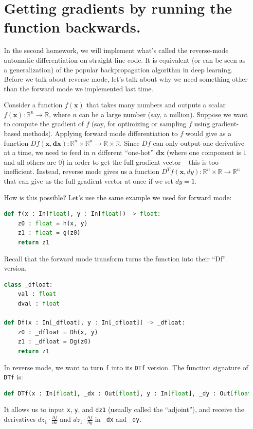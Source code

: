 




\section{Getting gradients by running the function backwards.}

In the second homework, we will implement what's called the reverse-mode automatic differentiation on straight-line code. It is equivalent (or can be seen as a generalization) of the popular backpropagation algorithm in deep learning. Before we talk about reverse mode, let's talk about why we need something other than the forward mode we implemented last time.

Consider a function $f(\mathbf{x})$ that takes many numbers and outputs a scalar $f(\mathbf{x}): \mathbb{R}^n \rightarrow \mathbb{R}$, where $n$ can be a large number (say, a million). Suppose we want to compute the gradient of $f$ (say, for optimizing or sampling $f$ using gradient-based methods). Applying forward mode differentiation to $f$ would give as a function $Df(\mathbf{x}, \mathbf{dx}) : \mathbb{R}^n \times \mathbb{R}^n \rightarrow \mathbb{R} \times \mathbb{R}$. Since $Df$ can only output one derivative at a time, we need to feed in $n$ different ``one-hot'' $\mathbf{dx}$ (where one component is $1$ and all others are $0$) in order to get the full gradient vector -- this is too inefficient. Instead, reverse mode gives us a function $D^{T}f(\mathbf{x}, dy) : \mathbb{R}^n \times \mathbb{R} \rightarrow \mathbb{R}^n$ that can give us the full gradient vector at once if we set $dy=1$.

How is this possible? Let's use the same example we used for forward mode:
\begin{lstlisting}[language=Python]
def f(x : In[float], y : In[float]) -> float:
	z0 : float = h(x, y)
	z1 : float = g(z0)
	return z1
\end{lstlisting}
Recall that the forward mode transform turns the function into their ``Df'' version.
\begin{lstlisting}[language=Python]
class _dfloat:
	val : float
	dval : float

def Df(x : In[_dfloat], y : In[_dfloat]) -> _dfloat:
	z0 : _dfloat = Dh(x, y)
	z1 : _dfloat = Dg(z0)
	return z1
\end{lstlisting}
In reverse mode, we want to turn \lstinline{f} into its \lstinline{DTf} version. The function signature of \lstinline{DTf} is:
\begin{lstlisting}[language=Python]
def DTf(x : In[float], _dx : Out[float], y : In[float], _dy : Out[float], dz1 : In[float])
\end{lstlisting}
It allows us to input \lstinline{x}, \lstinline{y}, and \lstinline{dz1} (usually called the ``adjoint''), and receive the derivatives $dz_1 \cdot \frac{\partial f}{\partial x}$ and $dz_1 \cdot \frac{\partial f}{\partial y}$ in \lstinline{_dx} and \lstinline{_dy}.

